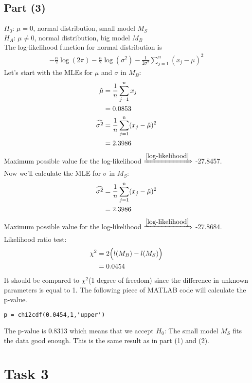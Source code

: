 \documentclass[british,a4paper,order=firstname]{mathscript}
\begin{document}
\subsection{Part (3)}
$H_0$: $\mu=0$, normal distribution, small model $M_S$ \\
$H_A$: $\mu\neq 0$, normal distribution, big model $M_B$ \\
The log-likelihood function for normal distribution is
\begin{align}
	\label{log-likelihood}
	-\frac{n}{2}\log(2\pi)-\frac{n}{2}\log(\sigma^2)-\frac{1}{2\sigma^2}\sum_{j=1}^{n} (x_j-\mu)^2
\end{align}
Let's start with the MLEs for $\mu$ and $\sigma$ in $M_B$:
\begin{align}
	\hat{\mu} &= \frac{1}{n}\sum_{j=1}^n x_j \notag \\
	&= 0.0853 \notag \\
	\widehat{\sigma^2} &= \frac{1}{n}\sum_{j=1}^n (x_j-\hat{\mu})^2 \notag \\
	&= 2.3986 \notag
\end{align}
Maximum possible value for the log-likelihood $\xRightarrow{\cref{log-likelihood}}$ -27.8457. \\
Now we'll calculate the MLE for $\sigma$ in $M_S$:
\begin{align}
	\widehat{\sigma^2} &= \frac{1}{n}\sum_{j=1}^n (x_j-\hat{\mu})^2 \notag \\
	&= 2.3986 \notag
\end{align}
Maximum possible value for the log-likelihood $\xRightarrow{\cref{log-likelihood}}$ -27.8684. \\
Likelihood ratio test:
\begin{align}
	\chi^2 &= 2\Big(l(M_B) - l(M_S)\Big) \notag \\
	&= 0.0454 \notag
\end{align}
It should be compared to $\chi^2$(1 degree of freedom) since the difference in unknown parameters is equal to 1. The following piece of MATLAB code will calculate the p-value.
\begin{lstlisting}
p = chi2cdf(0.0454,1,'upper')
\end{lstlisting}
The p-value is 0.8313 which means that we accept $H_0$: The small model $M_S$ fits the data good enough. This is the same result as in part (1) and (2).

\pagebreak
\section{Task 3}
\end{document}
